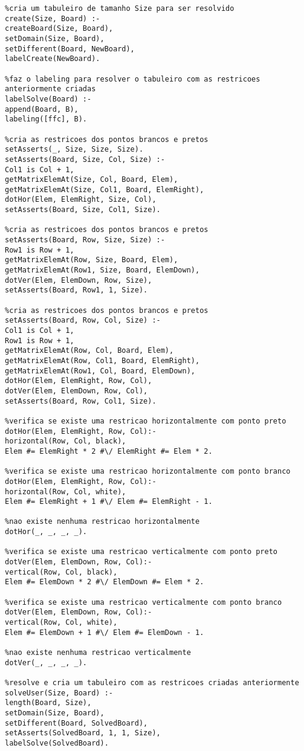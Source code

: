 \documentclass[runningheads,a4paper]{llncs}
\begin{document}
\begin{changemargin}{-3cm}{-4cm}
\begin{verbatim}
%cria um tabuleiro de tamanho Size para ser resolvido
create(Size, Board) :-
createBoard(Size, Board),
setDomain(Size, Board),
setDifferent(Board, NewBoard),
labelCreate(NewBoard).

%faz o labeling para resolver o tabuleiro com as restricoes anteriormente criadas
labelSolve(Board) :-
append(Board, B),
labeling([ffc], B).

%cria as restricoes dos pontos brancos e pretos
setAsserts(_, Size, Size, Size).
setAsserts(Board, Size, Col, Size) :-
Col1 is Col + 1,
getMatrixElemAt(Size, Col, Board, Elem),
getMatrixElemAt(Size, Col1, Board, ElemRight),
dotHor(Elem, ElemRight, Size, Col),
setAsserts(Board, Size, Col1, Size).

%cria as restricoes dos pontos brancos e pretos
setAsserts(Board, Row, Size, Size) :-
Row1 is Row + 1,
getMatrixElemAt(Row, Size, Board, Elem),
getMatrixElemAt(Row1, Size, Board, ElemDown),
dotVer(Elem, ElemDown, Row, Size),
setAsserts(Board, Row1, 1, Size).

%cria as restricoes dos pontos brancos e pretos
setAsserts(Board, Row, Col, Size) :-
Col1 is Col + 1,
Row1 is Row + 1,
getMatrixElemAt(Row, Col, Board, Elem),
getMatrixElemAt(Row, Col1, Board, ElemRight),
getMatrixElemAt(Row1, Col, Board, ElemDown),
dotHor(Elem, ElemRight, Row, Col),
dotVer(Elem, ElemDown, Row, Col),
setAsserts(Board, Row, Col1, Size).

%verifica se existe uma restricao horizontalmente com ponto preto
dotHor(Elem, ElemRight, Row, Col):-
horizontal(Row, Col, black),
Elem #= ElemRight * 2 #\/ ElemRight #= Elem * 2.

%verifica se existe uma restricao horizontalmente com ponto branco
dotHor(Elem, ElemRight, Row, Col):-
horizontal(Row, Col, white),
Elem #= ElemRight + 1 #\/ Elem #= ElemRight - 1.

%nao existe nenhuma restricao horizontalmente
dotHor(_, _, _, _).

%verifica se existe uma restricao verticalmente com ponto preto
dotVer(Elem, ElemDown, Row, Col):-
vertical(Row, Col, black),
Elem #= ElemDown * 2 #\/ ElemDown #= Elem * 2.

%verifica se existe uma restricao verticalmente com ponto branco
dotVer(Elem, ElemDown, Row, Col):-
vertical(Row, Col, white),
Elem #= ElemDown + 1 #\/ Elem #= ElemDown - 1.

%nao existe nenhuma restricao verticalmente
dotVer(_, _, _, _).

%resolve e cria um tabuleiro com as restricoes criadas anteriormente
solveUser(Size, Board) :-
length(Board, Size),
setDomain(Size, Board),
setDifferent(Board, SolvedBoard),
setAsserts(SolvedBoard, 1, 1, Size),
labelSolve(SolvedBoard).

		
		\end{verbatim}
	\end{changemargin}
	
\end{document}
